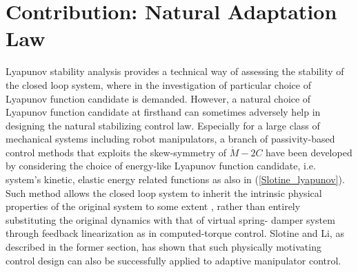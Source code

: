 \documentclass[letterpaper, 10 pt, conference]{ieeeconf}  %
\begin{document}
\section{Contribution: Natural Adaptation Law}
Lyapunov stability analysis provides a technical way of assessing the stability of the closed loop system, where in the investigation of particular choice of Lyapunov function candidate is demanded. However, a natural choice of Lyapunov function candidate at firsthand can sometimes adversely help in designing the natural stabilizing control law. Especially for a large class of mechanical systems including robot manipulators, a branch of passivity-based control methods that exploits the skew-symmetry of $\dot{M} - 2C$ have been developed by considering the choice of energy-like Lyapunov function candidate, i.e. system's kinetic, elastic energy related functions as also in (\ref{Slotine_lyapunov}). Such method allows the closed loop system to inherit the intrinsic physical properties of the original system to some extent \cite{Slotine_Magazine}, rather than entirely substituting the original dynamics with that of virtual spring- damper system through feedback linearization as in computed-torque control. Slotine and Li, as described in the former section, has shown that such physically motivating control design can also be successfully applied to adaptive manipulator control.
\end{document}

